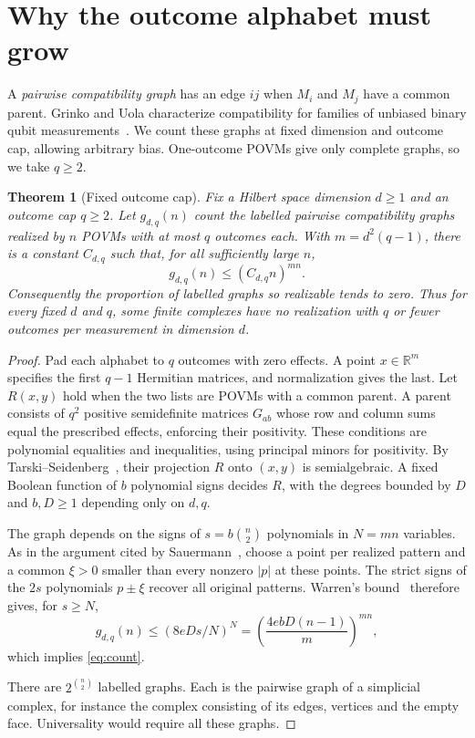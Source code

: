 \documentclass[11pt,a4paper]{article}
\newtheorem{theorem}{Theorem}
\theoremstyle{definition}
\newcommand{\R}{\mathbb R}
\begin{document}
\section{Why the outcome alphabet must grow}\label{sec:count}
A \emph{pairwise compatibility graph} has an edge \(ij\) when \(M_i\)
and \(M_j\) have a common parent. Grinko and Uola characterize compatibility
for families of unbiased binary qubit measurements~\cite{GU}. We count these
graphs at fixed dimension and outcome cap, allowing arbitrary bias.
One-outcome POVMs give only complete graphs, so we take \(q\ge2\).

\begin{theorem}[Fixed outcome cap]\label{thm:count}
Fix a Hilbert space dimension \(d\ge1\) and an outcome cap \(q\ge2\).
Let \(g_{d,q}(n)\) count the labelled pairwise compatibility graphs
realized by \(n\) POVMs with at most \(q\) outcomes each. With
\(m=d^2(q-1)\), there is a constant \(C_{d,q}\) such that, for all
sufficiently large \(n\),
\begin{equation}\label{eq:count}
       g_{d,q}(n)\le(C_{d,q}n)^{mn}.
\end{equation}
Consequently the proportion of labelled graphs so realizable tends to zero.
Thus for every fixed \(d\) and \(q\), some finite complexes have no realization
with \(q\) or fewer outcomes per measurement in dimension \(d\).
\end{theorem}
\begin{proof}
Pad each alphabet to \(q\) outcomes with zero effects. A point \(x\in\R^m\)
specifies the first \(q-1\) Hermitian matrices, and normalization gives the
last. Let \(R(x,y)\) hold when the two lists are POVMs with a common parent.
A parent consists of \(q^2\) positive semidefinite matrices \(G_{ab}\) whose
row and column sums equal the prescribed effects, enforcing their positivity.
These conditions are polynomial equalities and inequalities, using principal
minors for positivity. By Tarski--Seidenberg~\cite{Seidenberg}, their projection
\(R\) onto \((x,y)\) is semialgebraic. A fixed Boolean function of \(b\)
polynomial signs decides \(R\), with the degrees bounded by \(D\) and
\(b,D\ge1\) depending only on \(d,q\).

The graph depends on the signs of \(s=b\binom n2\) polynomials in \(N=mn\)
variables. As in the argument cited by Sauermann~\cite[App.~A.1]{Sauermann},
choose a point per realized pattern and a common \(\xi>0\) smaller than every
nonzero \(|p|\) at these points. The strict signs of the \(2s\) polynomials
\(p\pm\xi\) recover all original patterns. Warren's bound~\cite[Thm.~3]{Warren}
therefore gives, for \(s\ge N\),
\[
       g_{d,q}(n)\le (8eDs/N)^N
       = \left(\frac{4ebD(n-1)}{m}\right)^{mn},
\]
which implies \eqref{eq:count}.

There are \(2^{\binom n2}\) labelled graphs. Each is the pairwise graph
of a simplicial complex, for instance the complex consisting of its
edges, vertices and the empty face. Universality would require all these
graphs.
\end{proof}
\end{document}

